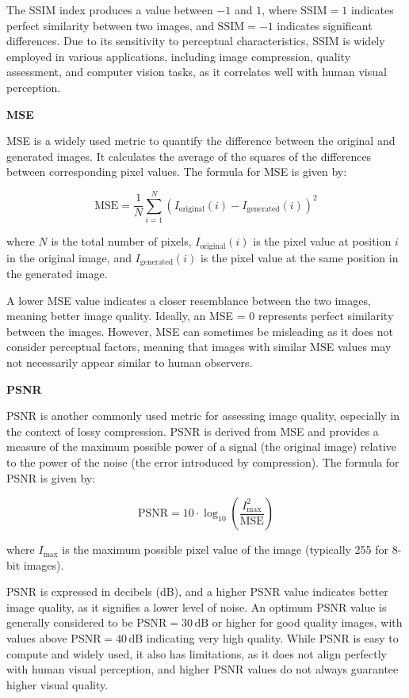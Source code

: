 \documentclass[12pt,DIV14,BCOR12mm,a4paper,footinclude=false,headinclude,parskip=half-,twoside,openright,cleardoublepage=empty,toc=index,bibliography=totoc,listof=totoc]{scrreprt}
\numberwithin{equation}{chapter}
\begin{document}
The SSIM index produces a value between $-1$ and $1$, where $\text{SSIM} = 1$ indicates perfect similarity between two images, and $\text{SSIM} = -1$ indicates significant differences. Due to its sensitivity to perceptual characteristics, SSIM is widely employed in various applications, including image compression, quality assessment, and computer vision tasks, as it correlates well with human visual perception.

\textbf{MSE}

MSE is a widely used metric to quantify the difference between the original and generated images. It calculates the average of the squares of the differences between corresponding pixel values. The formula for MSE is given by:

\begin{equation}
\text{MSE} = \frac{1}{N} \sum_{i=1}^{N} \left(I_{\text{original}}(i) - I_{\text{generated}}(i)\right)^2
\end{equation}

where \( N \) is the total number of pixels, \( I_{\text{original}}(i) \) is the pixel value at position \( i \) in the original image, and \( I_{\text{generated}}(i) \) is the pixel value at the same position in the generated image.

A lower MSE value indicates a closer resemblance between the two images, meaning better image quality. Ideally, an MSE = 0 represents perfect similarity between the images. However, MSE can sometimes be misleading as it does not consider perceptual factors, meaning that images with similar MSE values may not necessarily appear similar to human observers.

\textbf{PSNR}

PSNR is another commonly used metric for assessing image quality, especially in the context of lossy compression. PSNR is derived from MSE and provides a measure of the maximum possible power of a signal (the original image) relative to the power of the noise (the error introduced by compression). The formula for PSNR is given by:

\begin{equation}
\text{PSNR} = 10 \cdot \log_{10}\left(\frac{I_{\text{max}}^2}{\text{MSE}}\right)
\end{equation}

where \( I_{\text{max}} \) is the maximum possible pixel value of the image (typically 255 for 8-bit images).

PSNR is expressed in decibels (dB), and a higher PSNR value indicates better image quality, as it signifies a lower level of noise. An optimum PSNR value is generally considered to be $\text{PSNR} = 30\,\text{dB}$ or higher for good quality images, with values above $\text{PSNR} = 40\,\text{dB}$ indicating very high quality. While PSNR is easy to compute and widely used, it also has limitations, as it does not align perfectly with human visual perception, and higher PSNR values do not always guarantee higher visual quality.
\end{document}
